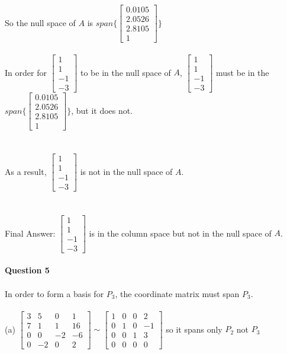 \documentclass{article}
\begin{document}
\\\\
So the null space of $A$ is $span\{\begin{bmatrix}0.0105\\2.0526\\2.8105\\1\end{bmatrix}\}$
\\\\
In order for $\begin{bmatrix}1\\1\\-1\\-3\end{bmatrix}$ to be in the null space of $A$, $\begin{bmatrix}1\\1\\-1\\-3\end{bmatrix}$ must be in the $span\{\begin{bmatrix}0.0105\\2.0526\\2.8105\\1\end{bmatrix}\}$, but it does not. \\\\\\ As a result, $\begin{bmatrix}1\\1\\-1\\-3\end{bmatrix}$ is not in the null space of $A$.
\\\\\\
Final Answer: $\begin{bmatrix}1\\1\\-1\\-3\end{bmatrix}$ is in the column space but not in the null space of $A$.
\\\\
\noindent\textbf{Question 5}\\\\
In order to form a basis for $P_3$, the coordinate matrix must span $P_3$.
\\\\
\indent(a)\indent
$\begin{bmatrix}3&5&0&1\\7&1&1&16\\0&0&-2&-6\\0&-2&0&2\end{bmatrix} \sim \begin{bmatrix}1&0&0&2\\0&1&0&-1\\0&0&1&3\\0&0&0&0\end{bmatrix} $ so it spans only $P_2$ not $P_3$
\end{document}
